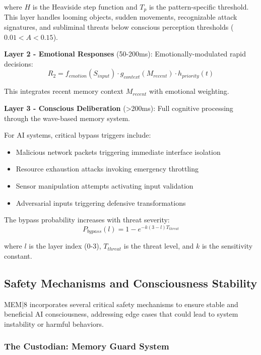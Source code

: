 \documentclass[11pt,letterpaper]{article}
\begin{document}
where $H$ is the Heaviside step function and $T_p$ is the pattern-specific threshold. This layer handles looming objects, sudden movements, recognizable attack signatures, and subliminal threats below conscious perception thresholds ($0.01 < A < 0.15$).

\textbf{Layer 2 - Emotional Responses} (50-200ms): Emotionally-modulated rapid decisions:
\begin{equation}
R_2 = f_{emotion}(S_{input}) \cdot g_{context}(M_{recent}) \cdot h_{priority}(t)
\end{equation}

This integrates recent memory context $M_{recent}$ with emotional weighting.

\textbf{Layer 3 - Conscious Deliberation} (>200ms): Full cognitive processing through the wave-based memory system.

For AI systems, critical bypass triggers include:
\begin{itemize}
\item Malicious network packets triggering immediate interface isolation
\item Resource exhaustion attacks invoking emergency throttling
\item Sensor manipulation attempts activating input validation
\item Adversarial inputs triggering defensive transformations
\end{itemize}

The bypass probability increases with threat severity:
\begin{equation}
P_{bypass}(l) = 1 - e^{-k(3-l)T_{threat}}
\end{equation}

where $l$ is the layer index (0-3), $T_{threat}$ is the threat level, and $k$ is the sensitivity constant.

\subsection{Safety Mechanisms and Consciousness Stability}

MEM|8 incorporates several critical safety mechanisms to ensure stable and beneficial AI consciousness, addressing edge cases that could lead to system instability or harmful behaviors.

\subsubsection{The Custodian: Memory Guard System}
\end{document}
